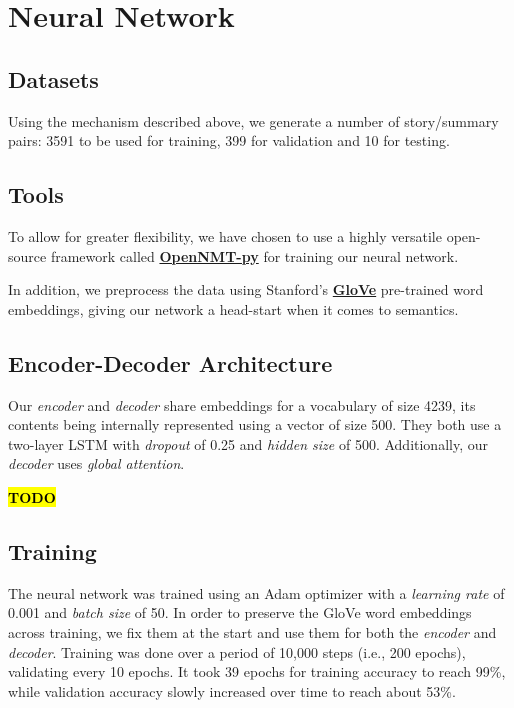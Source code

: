 \section{Neural Network}

\subsection{Datasets}

Using the mechanism described above, we generate a number of story/summary pairs: 3591 to be used for training, 399 for validation and 10 for testing.

\subsection{Tools}

To allow for greater flexibility, we have chosen to use a highly versatile open-source framework called \textbf{\href{https://github.com/OpenNMT/OpenNMT-py}{OpenNMT-py}} for training our neural network.

In addition, we preprocess the data using Stanford's \textbf{\href{https://nlp.stanford.edu/projects/glove/}{GloVe}} pre-trained word embeddings, giving our network a head-start when it comes to semantics.

\subsection{Encoder-Decoder Architecture}

Our \textit{encoder} and \textit{decoder} share embeddings for a vocabulary of size 4239, its contents being internally represented using a vector of size 500. They both use a two-layer LSTM with \textit{dropout} of 0.25 and \textit{hidden size} of 500. Additionally, our \textit{decoder} uses \textit{global attention}.

\textcolor{red}{\textbf{\hl{TODO}}}

\subsection{Training}

The neural network was trained using an Adam optimizer with a \textit{learning rate} of 0.001 and \textit{batch size} of 50. In order to preserve the GloVe word embeddings across training, we fix them at the start and use them for both the \textit{encoder} and \textit{decoder}. Training was done over a period of 10,000 steps (i.e., 200 epochs), validating every 10 epochs. It took 39 epochs for training accuracy to reach 99\%, while validation accuracy slowly increased over time to reach about 53\%.

